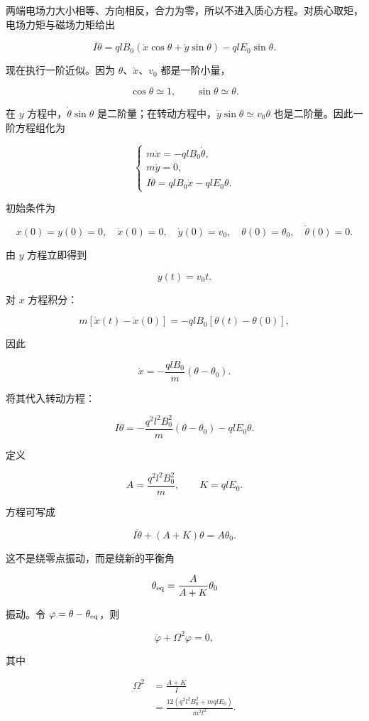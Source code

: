 \documentclass[12pt,a4paper,UTF8]{ctexart}
\begin{document}
两端电场力大小相等、方向相反，合力为零，所以不进入质心方程。对质心取矩，电场力矩与磁场力矩给出

\[I\ddot\theta
=qlB_0(\dot x\cos\theta+\dot y\sin\theta)-qlE_0\sin\theta.\]

现在执行一阶近似。因为 \(\theta\)、\(\dot x\)、\(v_0\) 都是一阶小量，

\[\cos\theta\simeq1,\qquad \sin\theta\simeq\theta.\]

在 \(y\) 方程中，\(\dot\theta\sin\theta\)
是二阶量；在转动方程中，\(\dot y\sin\theta\simeq v_0\theta\)
也是二阶量。因此一阶方程组化为

\[
\begin{cases}
m\ddot x=-qlB_0\dot\theta,\\
m\ddot y=0,\\
I\ddot\theta=qlB_0\dot x-qlE_0\theta.
\end{cases}
\]

初始条件为

\[x(0)=y(0)=0,\quad \dot x(0)=0,\quad \dot y(0)=v_0,\quad
\theta(0)=\theta_0,\quad\dot\theta(0)=0.\]

由 \(y\) 方程立即得到

\[\boxed{y(t)=v_0t}.\]

对 \(x\) 方程积分：

\[m[\dot x(t)-\dot x(0)]
=-qlB_0[\theta(t)-\theta(0)],\]

因此

\[\boxed{\dot x=-\frac{qlB_0}{m}(\theta-\theta_0)}.\]

将其代入转动方程：

\[I\ddot\theta
=-\frac{q^2l^2B_0^2}{m}(\theta-\theta_0)-qlE_0\theta.\]

定义

\[A=\frac{q^2l^2B_0^2}{m},\qquad K=qlE_0.\]

方程可写成

\[I\ddot\theta+(A+K)\theta=A\theta_0.\]

这不是绕零点振动，而是绕新的平衡角

\[\theta_{\rm eq}=\frac{A}{A+K}\theta_0\]

振动。令 \(\varphi=\theta-\theta_{\rm eq}\)，则

\[\ddot\varphi+\Omega^2\varphi=0,\]

其中

\[
\begin{aligned}
\Omega^2&=\frac{A+K}{I}\\
&=\frac{12(q^2l^2B_0^2+mqlE_0)}{m^2l^2}.
\end{aligned}
\]
\end{document}
